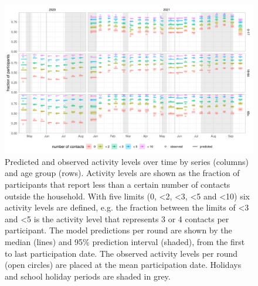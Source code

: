 \documentclass[fleqn,10pt]{wlscirep}
\begin{document}
\clearpage

\begin{figure}[ht]
\centering
\includegraphics[width=\linewidth]{../figures/prediction_studypopulation_cat6.png}
\caption{Predicted and observed activity levels over time by series (columns) and age group (rows). Activity levels are shown as the fraction of participants that report less than a certain number of contacts outside the household. With five limits (0, <2, <3, <5 and <10) six activity levels are defined, e.g. the fraction between the limits of <3 and <5 is the activity level that represents 3 or 4 contacts per participant. The model predictions per round are shown by the median (lines) and 95\% prediction interval (shaded), from the first to last participation date. The observed activity levels per round (open circles) are placed at the mean participation date. Holidays and school holiday periods are shaded in grey.}
\label{fig:studypop}
\end{figure}

\clearpage
\end{document}
